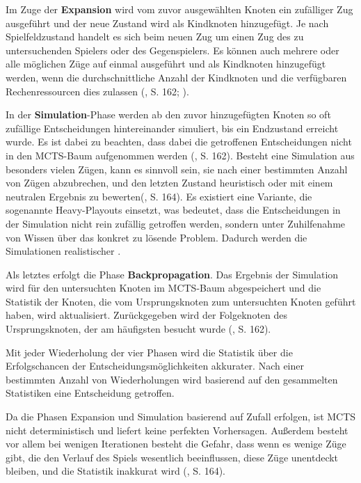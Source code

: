 Im Zuge der \textbf{Expansion} wird vom zuvor ausgewählten Knoten ein zufälliger Zug ausgeführt und der neue Zustand wird als Kindknoten hinzugefügt. Je nach Spielfeldzustand handelt es sich beim neuen Zug um einen Zug des zu untersuchenden Spielers oder des Gegenspielers. Es können auch mehrere oder alle möglichen Züge auf einmal ausgeführt und als Kindknoten hinzugefügt werden, wenn die durchschnittliche Anzahl der Kindknoten und die verfügbaren Rechenressourcen dies zulassen (\cite{Russell.2020}, S. 162; \cite{Browne.2012}).

In der \textbf{Simulation}-Phase werden ab den zuvor hinzugefügten Knoten so oft zufällige Entscheidungen hintereinander simuliert, bis ein Endzustand erreicht wurde. Es ist dabei zu beachten, dass dabei die getroffenen Entscheidungen nicht in den MCTS-Baum aufgenommen werden (\cite{Russell.2020}, S. 162). Besteht eine Simulation aus besonders vielen Zügen, kann es sinnvoll sein, sie nach einer bestimmten Anzahl von Zügen abzubrechen, und den letzten Zustand heuristisch oder mit einem neutralen Ergebnis zu bewerten(\cite{Russell.2020}, S. 164). Es existiert eine Variante, die sogenannte Heavy-Playouts einsetzt, was bedeutet, dass die Entscheidungen in der Simulation nicht rein zufällig getroffen werden, sondern unter Zuhilfenahme von Wissen über das konkret zu lösende Problem. Dadurch werden die Simulationen realistischer \cite{Browne.2012}.

Als letztes erfolgt die Phase \textbf{Backpropagation}. Das Ergebnis der Simulation wird für den untersuchten Knoten im MCTS-Baum abgespeichert und die Statistik der Knoten, die vom Ursprungsknoten zum untersuchten Knoten geführt haben, wird aktualisiert. Zurückgegeben wird der Folgeknoten des Ursprungsknoten, der am häufigsten besucht wurde (\cite{Russell.2020}, S. 162).

Mit jeder Wiederholung der vier Phasen wird die Statistik über die Erfolgschancen der Entscheidungsmöglichkeiten akkurater. Nach einer bestimmten Anzahl von Wiederholungen wird basierend auf den gesammelten Statistiken eine Entscheidung getroffen.

Da die Phasen Expansion und Simulation basierend auf Zufall erfolgen, ist MCTS nicht deterministisch und liefert keine perfekten Vorhersagen. Außerdem besteht vor allem bei wenigen Iterationen besteht die Gefahr, dass wenn es wenige Züge gibt, die den Verlauf des Spiels wesentlich beeinflussen, diese Züge unentdeckt bleiben, und die Statistik inakkurat wird (\cite{Russell.2020}, S. 164).

